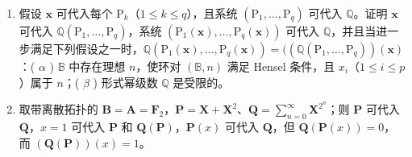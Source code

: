 \begin{enumerate}
\def\labelenumi{(\alph{enumi})}
\setcounter{enumi}{4}
\item
  假设 \(\mathbf{x}\) 可代入每个 \(\mathrm{P}_k\)（\(1 \leqslant k \leqslant q\)），且系统 \((\mathrm{P}_1, \ldots, \mathrm{P}_q)\) 可代入 \(\mathbb{Q}\)。证明 \(\mathbf{x}\) 可代入 \(\mathbb{Q}(\mathrm{P}_1, \ldots, \mathrm{P}_q)\)，系统 \((\mathrm{P}_1(\mathbf{x}), \ldots, \mathrm{P}_q(\mathbf{x}))\) 可代入 \(\mathbb{Q}\)，并且当进一步满足下列假设之一时，\(\mathbb{Q}(\mathrm{P}_1(\mathbf{x}), \ldots, \mathrm{P}_q(\mathbf{x})) = ((\mathbb{Q}(\mathrm{P}_1, \ldots, \mathrm{P}_q))(\mathbf{x})\)：( \(\alpha\) ) \(\mathbb{B}\) 中存在理想 \(n\)，使环对 \((\mathbb{B}, n)\) 满足 Hensel 条件，且 \(x_i\)（\(1 \leqslant i \leqslant p\)）属于 \(n\)；( \(\beta\) ) 形式幂级数 \(\mathbb{Q}\) 是受限的。
\item
  取带离散拓扑的 \(\mathbf{B} = \mathbf{A} = \mathbf{F}_2\)，\(\mathbf{P} = \mathbf{X} + \mathbf{X}^2\)、\(\mathbf{Q} = \sum_{n=0}^{\infty} \mathbf{X}^{2^n}\)；则 \(\mathbf{P}\) 可代入 \(\mathbf{Q}\)，\(x = 1\) 可代入 \(\mathbf{P}\) 和 \(\mathbf{Q}(\mathbf{P})\)，\(\mathbf{P}(x)\) 可代入 \(\mathbf{Q}\)，但 \(\mathbf{Q}(\mathbf{P}(x)) = 0\)，而 \((\mathbf{Q}(\mathbf{P}))(x) = 1\)。
\end{enumerate}
\relax{}
